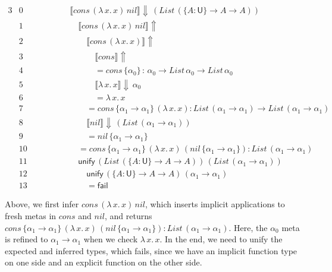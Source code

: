 \documentclass[acmsmall,screen,dvipsnames]{acmart}\settopmatter{}
\renewcommand{\U}{\mathsf{U}}
\newcommand{\unify}{\mathsf{unify}}
\newcommand{\fail}{\mathsf{fail}}
\newcommand{\mi}[1]{\mathit{#1}}
\newcommand{\echeckt}[2]{\llbracket#1\rrbracket\!\Downarrow\,#2}
\newcommand{\einfert}[1]{\llbracket#1\rrbracket\!\Uparrow}
\theoremstyle{remark}
\begin{document}
\begin{alignat*}{3}
  & \scriptstyle{0 }\qquad\qquad && \echeckt{cons\,(\lambda\,x.\,x)\,\mi{nil}}{(\mi{List}\,(\{A : \U\}\to A \to A))}
     \hspace{14em}\\
  & \scriptstyle{1 }  && \quad \einfert{\mi{cons}\,(\lambda\,x.\,x)\,\mi{nil}} \\
  & \scriptstyle{2 }  && \qquad \einfert{\mi{cons}\,(\lambda\,x.\,x)}\\
  & \scriptstyle{3 }  && \qquad\quad \einfert{\mi{cons}}\\
  & \scriptstyle{4 }  && \qquad\quad = \mi{cons}\,\{\alpha_0\}\,:\,\alpha_0 \to \mi{List}\,\alpha_0 \to \mi{List}\,\alpha_0\\
  & \scriptstyle{5 }  && \qquad\quad \echeckt{\lambda\,x.\,x}{\alpha_0}\\
  & \scriptstyle{6 }  && \qquad\quad = \lambda\,x.\,x\\
  & \scriptstyle{7 }  && \qquad = \mi{cons}\,\{\alpha_1 \to \alpha_1\}\,(\lambda\,x.\,x) : \mi{List}\,(\alpha_1\to\alpha_1) \to \mi{List}\,(\alpha_1\to\alpha_1)\\
  & \scriptstyle{8 }  && \qquad \echeckt{\mi{nil}}{(\mi{List}\,(\alpha_1\to\alpha_1))}\\
  & \scriptstyle{9 }  && \qquad = \mi{nil}\,\{\alpha_1\to\alpha_1\}\\
  & \scriptstyle{10} && \quad = \mi{cons}\,\{\alpha_1 \to \alpha_1\}\,(\lambda\,x.\,x)\,(\mi{nil}\,\{\alpha_1\to\alpha_1\}): \mi{List}\,(\alpha_1\to\alpha_1)\\
  & \scriptstyle{11} && \quad \unify\,(\mi{List}\,(\{A : \U\}\to A \to A))\,(\mi{List}\,(\alpha_1\to\alpha_1))\\
  & \scriptstyle{12} && \qquad \unify\,(\{A : \U\}\to A \to A)\,(\alpha_1\to\alpha_1)\\
  & \scriptstyle{13} && \qquad = \fail
\end{alignat*}

Above, we first infer $\mi{cons}\,(\lambda\,x.\,x)\,\mi{nil}$, which inserts implicit
applications to fresh metas in $cons$ and $nil$, and returns $cons\,\{\alpha_1
\to \alpha_1\}\,(\lambda\,x.\,x)\,(\mi{nil}\,\{\alpha_1\to\alpha_1\}) :
\mi{List}\,(\alpha_1\to\alpha_1)$. Here, the $\alpha_0$ meta is refined to $\alpha_1
\to \alpha_1$ when we check $\lambda\,x.\,x$. In the end, we need to unify the
expected and inferred types, which fails, since we have an implicit function
type on one side and an explicit function on the other side.
\end{document}
